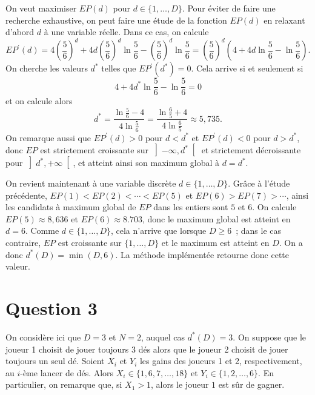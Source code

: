 \documentclass[a4paper,11pt]{amsart}
\theoremstyle{plain}
\begin{document}
On veut maximiser $EP(d)$ pour $d \in \{1, \dotsc, D\}$. Pour éviter de faire une recherche exhaustive, on peut faire une étude de la fonction $EP(d)$ en relaxant d'abord $d$ à une variable réelle. Dans ce cas, on calcule
\[
EP^\prime(d) = 4 \left(\frac{5}{6}\right)^d + 4 d \left(\frac{5}{6}\right)^d \ln \frac{5}{6} - \left(\frac{5}{6}\right)^d \ln \frac{5}{6} = \left(\frac{5}{6}\right)^d \left(4 + 4 d \ln \frac{5}{6} - \ln\frac{5}{6}\right).
\]
On cherche les valeurs $d^\ast$ telles que $EP^\prime(d^\ast) = 0$. Cela arrive si et seulement si
\[
4 + 4 d^\ast \ln \frac{5}{6} - \ln\frac{5}{6} = 0
\]
et on calcule alors
\[
d^\ast = \frac{\ln \frac{5}{6} - 4}{4 \ln \frac{5}{6}} = \frac{\ln \frac{6}{5} + 4}{4 \ln \frac{6}{5}} \approx 5,735.
\]
On remarque aussi que $EP^\prime(d) > 0$ pour $d < d^\ast$ et $EP^\prime(d) < 0$ pour $d > d^\ast$, donc $EP$ est strictement croissante sur $\left]-\infty, d^\ast\right[$ et strictement décroissante pour $\left]d^\ast, +\infty\right[$, et atteint ainsi son maximum global à $d = d^\ast$.

On revient maintenant à une variable discrète $d \in \{1, \dotsc, D\}$. Grâce à l'étude précédente, $EP(1) < EP(2) < \dotsb <EP(5)$ et $EP(6) > EP(7) > \dotsb$, ainsi les candidats à maximum global de $EP$ dans les entiers sont $5$ et $6$. On calcule $EP(5) \approx 8,636$ et $EP(6) \approx 8.703$, donc le maximum global est atteint en $d = 6$. Comme $d \in \{1, \dotsc, D\}$, cela n'arrive que lorsque $D \geq 6$~; dans le cas contraire, $EP$ est croissante sur $\{1, \dotsc, D\}$ et le maximum est atteint en $D$. On a donc $d^\ast(D) = \min(D, 6)$. La méthode implémentée retourne donc cette valeur.


\section{Question 3}

On considère ici que $D = 3$ et $N = 2$, auquel cas $d^\ast(D) = 3$. On suppose que le joueur 1 choisit de jouer toujours $3$ dés alors que le joueur 2 choisit de jouer toujours un seul dé. Soient $X_i$ et $Y_i$ les gains des joueurs 1 et 2, respectivement, au $i$-ème lancer de dés. Alors $X_i \in \{1, 6, 7, \dotsc, 18\}$ et $Y_i \in \{1, 2, \dotsc, 6\}$. En particulier, on remarque que, si $X_1 > 1$, alors le joueur $1$ est sûr de gagner.
\end{document}
